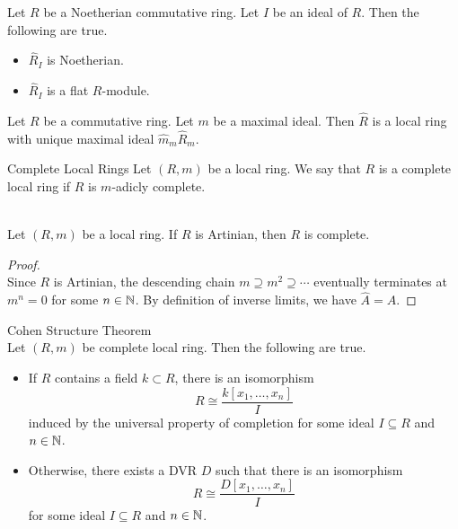 \documentclass[a4paper]{article}
\begin{document}
\begin{prp}{}{} Let $R$ be a Noetherian commutative ring. Let $I$ be an ideal of $R$. Then the following are true. 
\begin{itemize}
\item $\widehat{R}_I$ is Noetherian. 
\item $\widehat{R}_I$ is a flat $R$-module. 
\end{itemize}
\end{prp}

\begin{prp}{}{} Let $R$ be a commutative ring. Let $m$ be a maximal ideal. Then $\widehat{R}$ is a local ring with unique maximal ideal $\widehat{m}_m\widehat{R}_m$. 
\end{prp}

\begin{defn}{Complete Local Rings}{} Let $(R,m)$ be a local ring. We say that $R$ is a complete local ring if $R$ is $m$-adicly complete. 
\end{defn}

\begin{lmm}{}{}\\
Let $(R,m)$ be a local ring. If $R$ is Artinian, then $R$ is complete. 
\begin{proof}\\
Since $R$ is Artinian, the descending chain $m\supseteq m^2\supseteq\cdots$ eventually terminates at $m^n=0$ for some $n\in\mathbb{N}$. By definition of inverse limits, we have $\widehat{A}=A$. 
\end{proof}
\end{lmm}

\begin{thm}{Cohen Structure Theorem}{}\\
Let $(R,m)$ be complete local ring. Then the following are true. 
\begin{itemize}
\item If $R$ contains a field $k\subset R$, there is an isomorphism $$R\cong\frac{k[x_1,\dots,x_n]}{I}$$ induced by the universal property of completion for some ideal $I\subseteq R$ and $n\in\mathbb{N}$. 
\item Otherwise, there exists a DVR $D$ such that there is an isomorphism $$R\cong\frac{D[x_1,\dots,x_n]}{I}$$ for some ideal $I\subseteq R$ and $n\in\mathbb{N}$. 
\end{itemize}
\end{thm}
\end{document}
